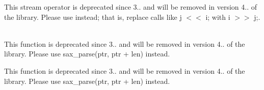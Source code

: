 \begin{DoxyRefList}
\label{deprecated__deprecated000008}%
%
This stream operator is deprecated since 3.. and will be removed in version 4.. of the library. Please use  instead; that is, replace calls like {\ttfamily j \texorpdfstring{$<$}{<}\texorpdfstring{$<$}{<} i;} with {\ttfamily i \texorpdfstring{$>$}{>}\texorpdfstring{$>$}{>} j;}.  
\item[Member \doxylink{classbasic__json_ad018e709338c810c56eaad606186a77e}{basic\+\_\+json\texorpdfstring{$<$}{<} Object\+Type, Array\+Type, String\+Type, Boolean\+Type, Number\+Integer\+Type, Number\+Unsigned\+Type, Number\+Float\+Type, Allocator\+Type, JSONSerializer, Binary\+Type, Custom\+Base\+Class \texorpdfstring{$>$}{>}\+::sax\+\_\+parse} (\doxylink{classdetail_1_1span__input__adapter}{detail\+::span\+\_\+input\+\_\+adapter} \&\&i, SAX \texorpdfstring{$\ast$}{*}sax, input\+\_\+format\+\_\+t format=input\+\_\+format\+\_\+t\+::json, const bool strict=true, const bool ignore\+\_\+comments=false)]\hfill \\
\label{deprecated__deprecated000003}%
%
This function is deprecated since 3.. and will be removed in version 4.. of the library. Please use sax\+\_\+parse(ptr, ptr + len) instead. 

\label{deprecated__deprecated000007}%
%
This function is deprecated since 3.. and will be removed in version 4.. of the library. Please use sax\+\_\+parse(ptr, ptr + len) instead. 
\end{DoxyRefList}